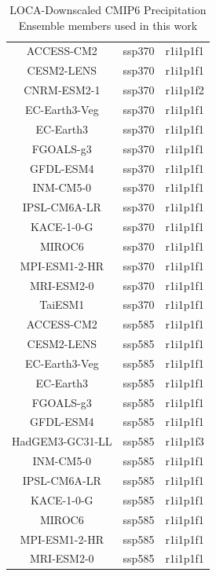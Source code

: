 \begin{table}
\begin{tabular}{|c|c|c|}
        \hline
        ACCESS-CM2 & ssp370 & r1i1p1f1 \\
        CESM2-LENS & ssp370 & r1i1p1f1 \\
        CNRM-ESM2-1 & ssp370 & r1i1p1f2 \\
        EC-Earth3-Veg & ssp370 & r1i1p1f1 \\
        EC-Earth3 & ssp370 & r1i1p1f1 \\
        FGOALS-g3 & ssp370 & r1i1p1f1 \\
        GFDL-ESM4 & ssp370 & r1i1p1f1 \\
        INM-CM5-0 & ssp370 & r1i1p1f1 \\
        IPSL-CM6A-LR & ssp370 & r1i1p1f1 \\
        KACE-1-0-G & ssp370 & r1i1p1f1 \\
        MIROC6 & ssp370 & r1i1p1f1 \\
        MPI-ESM1-2-HR & ssp370 & r1i1p1f1 \\
        MRI-ESM2-0 & ssp370 & r1i1p1f1 \\
        TaiESM1 & ssp370 & r1i1p1f1 \\
        \hline

        ACCESS-CM2 & ssp585 & r1i1p1f1 \\
        CESM2-LENS & ssp585 & r1i1p1f1 \\
        EC-Earth3-Veg & ssp585 & r1i1p1f1 \\
        EC-Earth3 & ssp585 & r1i1p1f1 \\
        FGOALS-g3 & ssp585 & r1i1p1f1 \\
        GFDL-ESM4 & ssp585 & r1i1p1f1 \\
        HadGEM3-GC31-LL & ssp585 & r1i1p1f3 \\
        INM-CM5-0 & ssp585 & r1i1p1f1 \\
        IPSL-CM6A-LR & ssp585 & r1i1p1f1 \\
        KACE-1-0-G & ssp585 & r1i1p1f1 \\
        MIROC6 & ssp585 & r1i1p1f1 \\
        MPI-ESM1-2-HR & ssp585 & r1i1p1f1 \\
        MRI-ESM2-0 & ssp585 & r1i1p1f1 \\

        \hline
    \end{tabular}
    \caption{LOCA-Downscaled CMIP6 Precipitation Ensemble members used in this work}
\end{table}

